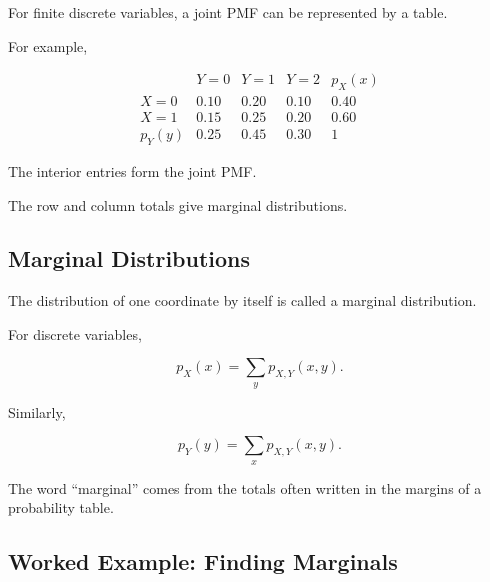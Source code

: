 For finite discrete variables, a joint PMF can be represented by a
table.

For example,

\[
\begin{array}{c|ccc|c}
 & Y=0 & Y=1 & Y=2 & p_X(x)\\
\hline
X=0 & 0.10 & 0.20 & 0.10 & 0.40\\
X=1 & 0.15 & 0.25 & 0.20 & 0.60\\
\hline
p_Y(y) & 0.25 & 0.45 & 0.30 & 1
\end{array}
\]

The interior entries form the joint PMF.

The row and column totals give marginal distributions.

\subsection{Marginal Distributions}
\label{subsec:marginal-distributions}

The distribution of one coordinate by itself is called a marginal
distribution.

For discrete variables,

\[
\boxed{
p_X(x)
=
\sum_y
p_{X,Y}(x,y).
}
\]

Similarly,

\[
\boxed{
p_Y(y)
=
\sum_x
p_{X,Y}(x,y).
}
\]

The word ``marginal'' comes from the totals often written in the margins
of a probability table.

\subsection{Worked Example: Finding Marginals}
\label{subsec:worked-discrete-marginals}

